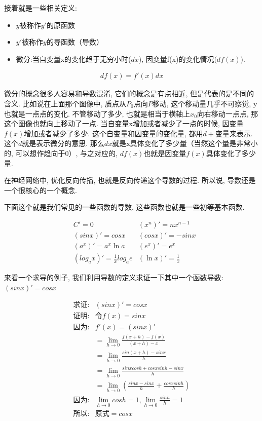 接着就是一些相关定义:

\begin{itemize}
  \item $y$被称作$y'$的原函数
  \item $y'$被称作$y$的导函数（导数）
  \item 微分:当自变量x的变化趋于无穷小时($dx$), 因变量f(x)的变化情况($df(x)$). 
\end{itemize}

\begin{align*}
  df(x)=f'(x)dx
\end{align*}

微分的概念很多人容易和导数混淆, 它们的概念是有点相近, 但是代表的是不同的含义. 比如说在上面那个图像中, 质点从$P_0$点向$P$移动, 这个移动量几乎不可察觉, y也就是一点点的变化. 不管移动了多少, 也就是相当于横轴上$x_0$向右移动一点点, 那这个图像也就向上移动了一点. 当自变量x增加或者减少了一点的时候, 因变量$f(x)$增加或者减少了多少. 这个自变量和因变量的变化量, 都用$d+\mbox{变量}$来表示. 这个$d$就是表示微分的意思. 那么$dx$就是x具体变化了多少量（当然这个量是非常小的, 可以想作趋向于0）, 与之对应的, $df(x)$也就是因变量$f(x)$具体变化了多少量. 

在神经网络中, 优化反向传播, 也就是反向传递这个导数的过程. 所以说, 导数还是一个很核心的一个概念. 

下面这个就是我们常见的一些函数的导数, 这些函数也就是一些初等基本函数. 

\begin{align*}
  & C'=0 & (x^n)'=nx^{n-1} \\
  & (sinx)'=cosx & (cosx)'=-sinx \\
  & (a^x)'=a^x \ln a & (e^x)'=e^x \\
  & (log_a{x})'=\frac{1}{x}log_a{e} & (\ln x)'=\frac{1}{x}
\end{align*}

来看一个求导的例子, 我们利用导数的定义求证一下其中一个函数导数: $(sinx)'=cosx$

\begin{align*}
  \mbox{求证}:&  (sinx)'=cosx \\
  \mbox{证明}:& \mbox{令}f(x)=sinx \\
  \mbox{因为}:& f'(x)=(sinx)' \\ 
  & =\lim_{h\to0}\frac{f(x+h)-f(x)}{(x+h)-x} \\
  & =\lim_{h\to0}\frac{sin(x+h) - sinx}{h} \\ 
  & =\lim_{h\to0}\frac{sinx cosh + cosx sinh - sinx}{h} \\
  & =\lim_{h\to0}(\frac{sinx - sinx}{h} + \frac{cosx sinh}{h}) \\
  \mbox{因为}: & \lim_{h\to 0}cosh=1, \lim_{h\to0}\frac{sinh}{h}=1 \\
  \mbox{所以}: & \mbox{原式} =cosx
\end{align*}

